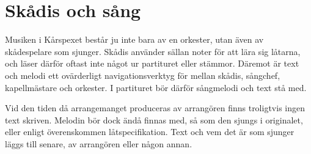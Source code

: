 \newpage
\section{Skådis och sång}
Musiken i Kårspexet består ju inte bara av en orkester, utan även av skådespelare som sjunger. Skådis använder sällan noter för att lära sig låtarna, och läser därför oftast inte något ur partituret eller stämmor. Däremot är text och melodi ett ovärderligt navigationsverktyg för mellan skådis, sångchef, kapellmästare och orkester. I partituret bör därför sångmelodi och text stå med. 

Vid den tiden då arrangemanget produceras av arrangören finns troligtvis ingen text skriven. Melodin bör dock ändå finnas med, så som den sjungs i originalet, eller enligt överenskommen låtspecifikation. Text och vem det är som sjunger läggs till senare, av arrangören eller någon annan.

